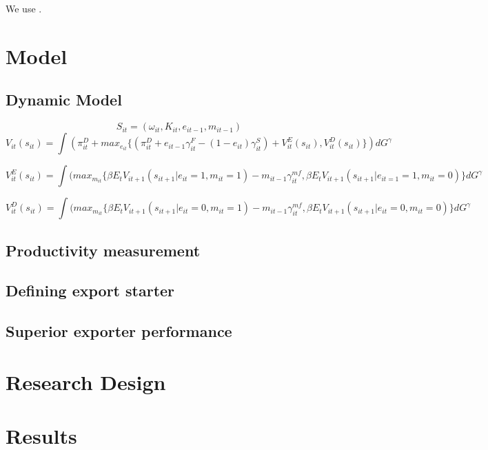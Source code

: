 \documentclass[11pt]{article}
\begin{document}
We use \cite{aw2011}.


\section{Model}


\subsection{Dynamic Model}
 $$ S_{it} = (\omega_{it}, K_{it}, e_{it-1}, m_{it-1})$$
\begin{equation}
  V_{it}(s_{it}) = \int (\pi_{it}^D + max_{e_{it}}\{( \pi_{it}^D +
  e_{it-1}\gamma_{it}^{F} - (1- e_{it})\gamma_{it}^{S}) + V_{it}^{E}(s_{it}) ,
  V_{it}^{D}(s_{it})\}) dG^{\gamma}
\end{equation}


\begin{equation}
  V_{it}^E(s_{it}) = \int ( max_{m_{it}}\{ \beta E_{t}
  V_{it+1}(s_{it+1}|e_{it}=1, m_{it} =1) - m_{it-1} \gamma_{it}^{mf} , \beta E_{t}
  V_{it+1}(s_{it+1}|e_{it=1}=1, m_{it} =0) \} dG^{\gamma}
\end{equation}


\begin{equation}
  V_{it}^D(s_{it}) = \int ( max_{m_{it}}\{ \beta E_{t}
  V_{it+1}(s_{it+1}|e_{it}=0, m_{it} =1) - m_{it-1} \gamma_{it}^{mf} , \beta E_{t}
  V_{it+1}(s_{it+1}|e_{it}=0, m_{it} =0) \} dG^{\gamma}
\end{equation}
\subsection{Productivity measurement}


\subsection{Defining export starter}\label{subsec:starter}


\subsection{Superior exporter performance}


\section{Research Design}\label{sec:design}


\section{Results}\label{sec:methodology}
\end{document}
